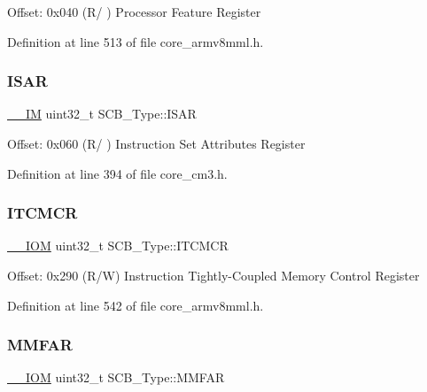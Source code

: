 Offset\+: 0x040 (R/ ) Processor Feature Register 

Definition at line 513 of file core\+\_\+armv8mml.\+h.

\mbox{\label{struct_s_c_b___type_a00e93446b3433a807f1574fa2f1fce54}} 
\subsubsection{\texorpdfstring{I\+S\+AR}{ISAR}}
{\footnotesize\ttfamily \hyperlink{core__sc300_8h_a4cc1649793116d7c2d8afce7a4ffce43}{\+\_\+\+\_\+\+IM} uint32\+\_\+t S\+C\+B\+\_\+\+Type\+::\+I\+S\+AR}

Offset\+: 0x060 (R/ ) Instruction Set Attributes Register 

Definition at line 394 of file core\+\_\+cm3.\+h.

\mbox{\label{struct_s_c_b___type_aba8abbd3db06a07b50f56547501983f9}} 
\subsubsection{\texorpdfstring{I\+T\+C\+M\+CR}{ITCMCR}}
{\footnotesize\ttfamily \hyperlink{core__sc300_8h_ab6caba5853a60a17e8e04499b52bf691}{\+\_\+\+\_\+\+I\+OM} uint32\+\_\+t S\+C\+B\+\_\+\+Type\+::\+I\+T\+C\+M\+CR}

Offset\+: 0x290 (R/W) Instruction Tightly-\/\+Coupled Memory Control Register 

Definition at line 542 of file core\+\_\+armv8mml.\+h.

\mbox{\label{struct_s_c_b___type_a2d03d0b7cec2254f39eb1c46c7445e80}} 
\subsubsection{\texorpdfstring{M\+M\+F\+AR}{MMFAR}}
{\footnotesize\ttfamily \hyperlink{core__sc300_8h_ab6caba5853a60a17e8e04499b52bf691}{\+\_\+\+\_\+\+I\+OM} uint32\+\_\+t S\+C\+B\+\_\+\+Type\+::\+M\+M\+F\+AR}

